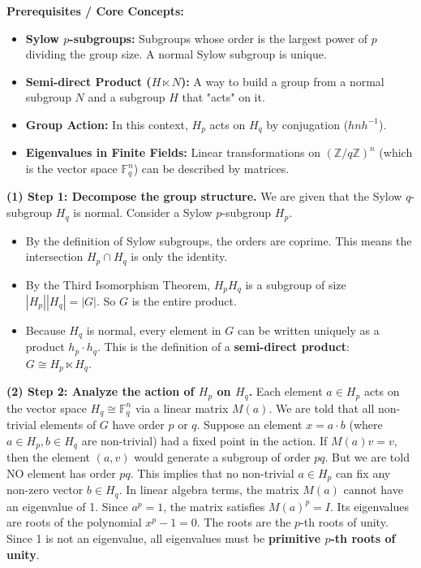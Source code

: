 \begin{solution}
\textbf{Prerequisites / Core Concepts:}
\begin{itemize}
    \item \textbf{Sylow $p$-subgroups:} Subgroups whose order is the largest power of $p$ dividing the group size. A normal Sylow subgroup is unique.
    \item \textbf{Semi-direct Product ($H \ltimes N$):} A way to build a group from a normal subgroup $N$ and a subgroup $H$ that "acts" on it.
    \item \textbf{Group Action:} In this context, $H_p$ acts on $H_q$ by conjugation ($hnh^{-1}$).
    \item \textbf{Eigenvalues in Finite Fields:} Linear transformations on $(\mathbb{Z}/q\mathbb{Z})^n$ (which is the vector space $\mathbb{F}_q^n$) can be described by matrices.
\end{itemize}

\textbf{(1) Step 1: Decompose the group structure.}
We are given that the Sylow $q$-subgroup $H_q$ is normal.
Consider a Sylow $p$-subgroup $H_p$.
\begin{itemize}
    \item By the definition of Sylow subgroups, the orders are coprime. This means the intersection $H_p \cap H_q$ is only the identity.
    \item By the Third Isomorphism Theorem, $H_p H_q$ is a subgroup of size $|H_p||H_q| = |G|$. So $G$ is the entire product.
    \item Because $H_q$ is normal, every element in $G$ can be written uniquely as a product $h_p \cdot h_q$. This is the definition of a \textbf{semi-direct product}: $G \cong H_p \ltimes H_q$.
\end{itemize}

\textbf{(2) Step 2: Analyze the action of $H_p$ on $H_q$.}
Each element $a \in H_p$ acts on the vector space $H_q \cong \mathbb{F}_q^n$ via a linear matrix $M(a)$.
We are told that all non-trivial elements of $G$ have order $p$ or $q$.
Suppose an element $x = a \cdot b$ (where $a \in H_p, b \in H_q$ are non-trivial) had a fixed point in the action. If $M(a)v = v$, then the element $(a, v)$ would generate a subgroup of order $pq$.
But we are told NO element has order $pq$. This implies that no non-trivial $a \in H_p$ can fix any non-zero vector $b \in H_q$.
In linear algebra terms, the matrix $M(a)$ cannot have an eigenvalue of 1.
Since $a^p = 1$, the matrix satisfies $M(a)^p = I$. Its eigenvalues are roots of the polynomial $x^p - 1 = 0$.
The roots are the $p$-th roots of unity. Since 1 is not an eigenvalue, all eigenvalues must be \textbf{primitive $p$-th roots of unity}.


\end{solution}
